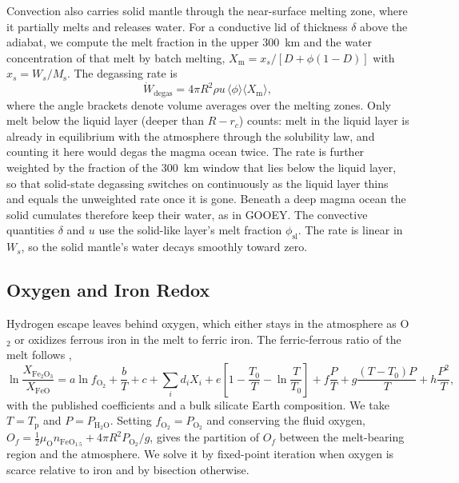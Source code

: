 \documentclass[11pt]{article}
\newcommand{\Tp}{T_\mathrm{p}}
\begin{document}
Convection also carries solid mantle through the near-surface melting zone, where it partially melts and releases water. For a conductive lid of thickness $\delta$ above the adiabat, we compute the melt fraction in the upper 300~km and the water concentration of that melt by batch melting, $X_\mathrm{m} = x_s / [D + \phi (1 - D)]$ with $x_s = W_s / M_\mathrm{s}$. The degassing rate is
\begin{equation}
\dot{W}_\mathrm{degas} = 4 \pi R^2 \rho u \, \langle \phi \rangle \langle X_\mathrm{m} \rangle,
\end{equation}
where the angle brackets denote volume averages over the melting zones. Only melt below the liquid layer (deeper than $R - r_c$) counts: melt in the liquid layer is already in equilibrium with the atmosphere through the solubility law, and counting it here would degas the magma ocean twice. The rate is further weighted by the fraction of the 300~km window that lies below the liquid layer, so that solid-state degassing switches on continuously as the liquid layer thins and equals the unweighted rate once it is gone. Beneath a deep magma ocean the solid cumulates therefore keep their water, as in GOOEY. The convective quantities $\delta$ and $u$ use the solid-like layer's melt fraction $\phi_\mathrm{sl}$. The rate is linear in $W_s$, so the solid mantle's water decays smoothly toward zero.

\subsection{Oxygen and Iron Redox}

Hydrogen escape leaves behind oxygen, which either stays in the atmosphere as O$_2$ or oxidizes ferrous iron in the melt to ferric iron. The ferric-ferrous ratio of the melt follows \citet{Kress1991},
\begin{equation}
\ln \frac{X_{\mathrm{Fe_2O_3}}}{X_{\mathrm{FeO}}} = a \ln f_{\mathrm{O_2}} + \frac{b}{T} + c + \sum_i d_i X_i
+ e \left[ 1 - \frac{T_0}{T} - \ln \frac{T}{T_0} \right] + f \frac{P}{T} + g \frac{(T - T_0) P}{T} + h \frac{P^2}{T},
\end{equation}
with the published coefficients and a bulk silicate Earth composition. We take $T = \Tp$ and $P = P_{\mathrm{H_2O}}$. Setting $f_{\mathrm{O_2}} = P_{\mathrm{O_2}}$ and conserving the fluid oxygen, $O_f = \tfrac{1}{2} \mu_\mathrm{O} n_{\mathrm{FeO_{1.5}}} + 4 \pi R^2 P_{\mathrm{O_2}} / g$, gives the partition of $O_f$ between the melt-bearing region and the atmosphere. We solve it by fixed-point iteration when oxygen is scarce relative to iron and by bisection otherwise.
\end{document}

